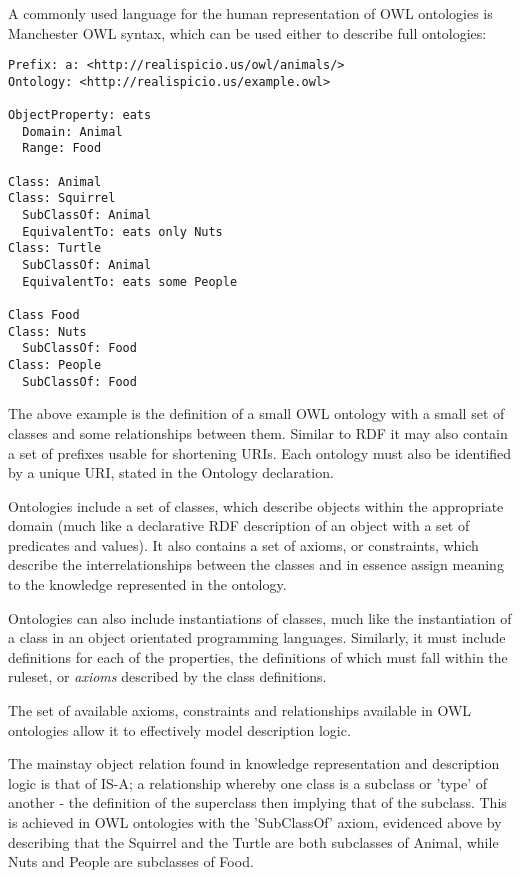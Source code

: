 \documentclass{article}
\begin{document}
A commonly used language for the human representation of OWL ontologies is
Manchester OWL syntax, which can be used either to describe full ontologies:

\begin{lstlisting}
Prefix: a: <http://realispicio.us/owl/animals/>
Ontology: <http://realispicio.us/example.owl>

ObjectProperty: eats
  Domain: Animal
  Range: Food

Class: Animal
Class: Squirrel
  SubClassOf: Animal
  EquivalentTo: eats only Nuts
Class: Turtle
  SubClassOf: Animal
  EquivalentTo: eats some People

Class Food
Class: Nuts
  SubClassOf: Food
Class: People
  SubClassOf: Food
\end{lstlisting}

The above example is the definition of a small OWL ontology with a small set of 
classes and some relationships between them. Similar to RDF it
may also contain a set of prefixes usable for shortening URIs. Each ontology
must also be identified by a unique URI, stated in the Ontology declaration.

Ontologies include a set of classes, which describe objects within the appropriate 
domain (much like a declarative RDF description of an object with a set of predicates 
and values). It also contains a set of axioms, or constraints, which describe the 
interrelationships between the classes and in essence assign meaning to the
knowledge represented in the ontology.

Ontologies can also include instantiations of classes, much like the
instantiation of a class in an object orientated programming languages.
Similarly, it must include definitions for each of the properties, the
definitions of which must fall within the ruleset, or \emph{axioms} 
described by the class definitions.

The set of available axioms, constraints and relationships available in OWL
ontologies allow it to effectively model description logic\cite{desclogic}. 

The mainstay object relation found in knowledge representation and description
logic is that of IS-A; a relationship whereby one class is a subclass or 'type'
of another - the definition of the superclass then implying that of the
subclass. This is achieved in OWL ontologies with the 'SubClassOf' axiom,
evidenced above by describing that the Squirrel and the Turtle are both
subclasses of Animal, while Nuts and People are subclasses of Food.
\end{document}
